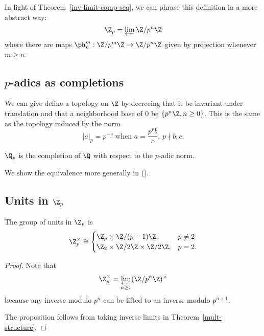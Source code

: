 In light of Theorem~\ref{inv-limit-comp-seq}, we can phrase this definition in a more abstract way:
\[
\Z_p=\varprojlim \Z/p^n\Z
\]
where there are maps $\ph^m_n: \Z/p^{m}\Z\to \Z/p^n\Z$ given by projection whenever $m\ge n$. %
\subsection{$p$-adics as completions}
We can give define a topology on $\Z$ by decreeing that it be invariant under translation and that a neighborhood base of $0$ be $\{p^n\Z,n\ge 0\}$. This is the same as the topology induced by the norm
\[
|a|_p=p^{-v}\text{ when }a=\frac{p^vb}{c},\,p\nmid b,c.
\]
\begin{df}
$\Q_p$ is the completion of $\Q$ with respect to the $p$-adic norm.
\end{df}
We show the equivalence more generally in ().
\subsection{Units in $\Z_p$}
\begin{pr}
The group of units in $\Z_p$ is
\[
\Z_p^{\times}\cong
\begin{cases}
\Z_p\times \Z/(p-1)\Z,&p\ne 2\\
\Z_2\times \Z/2\Z\times \Z/2\Z,&p=2.\end{cases}
\]
\end{pr}
\begin{proof}
Note that
\[
\Z_p^{\times}=\varprojlim_{n\ge 1} (\Z/p^n\Z)^{\times}
\]
because any inverse modulo $p^n$ can be lifted to an inverse modulo $p^{n+1}$.

The proposition follows from taking inverse limits in Theorem~\ref{mult-structure}.
\end{proof}
